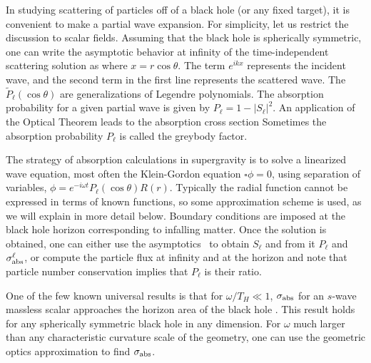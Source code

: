 In studying scattering of particles off of a black hole (or any fixed
target), it is convenient to make a partial wave expansion.  For
simplicity, let us restrict the discussion to scalar fields.  Assuming that
the black hole is spherically symmetric, one can write the asymptotic
behavior at infinity of the time-independent scattering solution as
 where $x = r\cos \theta$.  The term $e^{ikx}$ represents the incident
wave, and the second term in the first line represents the scattered wave.
The $\tilde{P}_\ell(\cos\theta)$ are generalizations of Legendre
polynomials.  The absorption probability for a given
partial wave is given by
$P_\ell = 1-|S_\ell|^2$.  An application of the Optical
Theorem leads to the absorption cross section \cite{Gubser:1997qr}
 Sometimes the absorption probability $P_\ell$ is called the greybody
factor.

The strategy of absorption calculations in supergravity is to solve a
linearized wave equation, most often the Klein-Gordon
 equation $\square \phi =
0$, using separation of variables, $\phi = e^{-i\omega t}
P_\ell(\cos\theta) R(r)$.  Typically the radial function cannot be
expressed in terms of known functions, so some approximation scheme is
used, as we will explain in more detail below.  Boundary conditions are
imposed at the black hole horizon corresponding to infalling matter.  Once
the solution is obtained, one can either use the asymptotics \PartialWave\
to obtain $S_\ell$ and from it $P_\ell$ and $\sigma_{\rm abs}^\ell$, or
compute the particle flux at infinity and at the horizon and note that
particle number conservation implies that $P_\ell$ is their ratio.

One of the few known universal results is that for $\omega/T_H \ll 1$,
$\sigma_{\rm abs}$ for an $s$-wave massless scalar approaches the horizon
area of the black hole \cite{Das:1997we}.  This result holds for any
spherically symmetric black hole in any dimension.  For $\omega$ much
larger than any characteristic curvature scale of the geometry, one can use
the geometric optics approximation to find $\sigma_{\rm abs}$.

